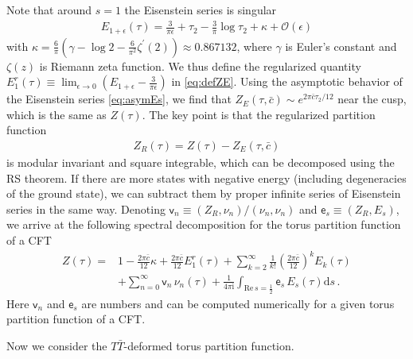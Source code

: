 \documentclass[aps,twocolumn,prl,showpacs,amsmath,amssymb,10pt]{revtex4-2}
\def\tc{\bar{c}}
\begin{document}
Note that around $s=1$ the Eisenstein series is singular
\begin{align}
E_{1+\epsilon}(\tau)=\frac{3}{\pi\epsilon}+\tau_2-\frac{3}{\pi}\log\tau_2+\kappa+\mathcal{O}(\epsilon)
\end{align}
with $\kappa=\frac{6}{\pi}\left(\gamma-\log 2-\frac{6}{\pi^2} \zeta^{\prime}(2)\right)\approx 0.867132$, where $\gamma$ is Euler’s constant and $\zeta(z)$ is
Riemann zeta function. We thus define the regularized quantity $E_1^r(\tau)\equiv\lim_{\epsilon\to 0}(E_{1+\epsilon}-\frac{3}{\pi\epsilon})$ in \eqref{eq:defZE}. Using the asymptotic behavior of the Eisenstein series \eqref{eq:asymEs}, we find that $Z_E(\tau,\tc)\sim e^{2\pi \tc\tau_2/12}$ near the cusp, which is the same as $Z(\tau)$. The key point is that the regularized partition function
\begin{align}
Z_R(\tau)=Z(\tau)-Z_E(\tau,\tc)
\end{align}
is modular invariant and square integrable, which can be decomposed using the RS theorem. If there are more states with negative energy (including degeneracies of the ground state), we can subtract them by proper infinite series of Eisenstein series in the same way. Denoting $\mathsf{v}_n\equiv(Z_R,\nu_n)/(\nu_n,\nu_n)$ and $\mathsf{e}_s\equiv(Z_R,E_s)$, we arrive at the following spectral decomposition for the torus partition function of a CFT
\begin{equation}
\label{eq:RSdecomZ}
\begin{aligned}
Z(\tau)=&1-\frac{2\pi \tc}{12}\kappa+\frac{2\pi \tc}{12}E_1^r(\tau)+\sum_{k=2}^{\infty}\frac{1}{k!}\left(\frac{2\pi \tc}{12}\right)^kE_k(\tau)\\
&+\sum_{n=0}^{\infty}\mathsf{v}_n\,\nu_n(\tau)+\frac{1}{4\pi\mathrm{i}}\int_{\text{Re}\,s=\frac{1}{2}}\mathsf{e}_s\,E_s(\tau)\mathrm{d}s\,.
\end{aligned}
\end{equation}
Here $\mathsf{v}_n$ and $\mathsf{e}_s$ are numbers and can be computed numerically for a given torus partition function of a CFT.
\vspace{0.5cm}


Now we consider the $T\bar{T}$-deformed torus partition function.
\end{document}
